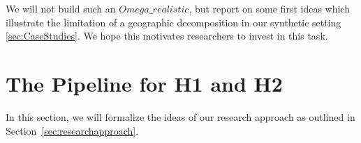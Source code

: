 \documentclass{article}
\begin{document}
We will not build such an $Omega\_realistic$, but report on some first ideas which illustrate the limitation of a geographic decomposition in our synthetic setting \ref{sec:CaseStudies}. We hope this motivates researchers to invest in this task.



\section{The Pipeline for H1 and H2}

In this section, we will formalize the ideas of our research approach as outlined in Section~\ref{sec:researchapproach}.


\end{document}
